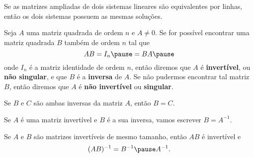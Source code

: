 \documentclass{beamer}
\begin{document}
    \begin{frame}
        \begin{teorema}
            Se as matrizes ampliadas \pause de dois sistemas lineares são equivalentes por linhas, \pause então os dois sistemas possuem as mesmas soluções.
        \end{teorema}
    \end{frame}

    \begin{frame}
        \begin{definicao}
            Seja $A$ uma matriz quadrada de ordem $n$ \pause e $A \ne 0$. \pause Se for possível encontrar uma matriz quadrada $B$ \pause também de
            ordem $n$ tal que\pause
            \[
                AB = I_n \pause = BA\pause
            \]
            onde $I_n$ é a matriz identidade de ordem $n$, \pause então diremos que $A$ é \textbf{invertível}, \pause ou \textbf{não singular}, \pause
            e que $B$ é a \textbf{inversa} de $A$. \pause Se não pudermos encontrar tal matriz $B$, \pause então diremos que $A$ é \textbf{não invertível} \pause
            ou \textbf{singular}.
        \end{definicao}
    \end{frame}

    \begin{frame}
        \begin{teorema}
            Se $B$ e $C$ são ambas inversas da matriz $A$, \pause então $B = C$.\pause
        \end{teorema}

        \vspace{1cm}

        \begin{notacao}
            Se $A$ é uma matriz invertível \pause e $B$ é a sua inversa, \pause vamos escrever $B = A^{-1}$.
        \end{notacao}
    \end{frame}

    \begin{frame}
        \begin{proposicao}
            Se $A$ e $B$ são matrizes invertíveis de mesmo tamanho, \pause então $AB$ é invertível \pause e
            \[
                (AB)^{-1} = B^{-1}\pause A^{-1}.
            \]
        \end{proposicao}
    \end{frame}
\end{document}
